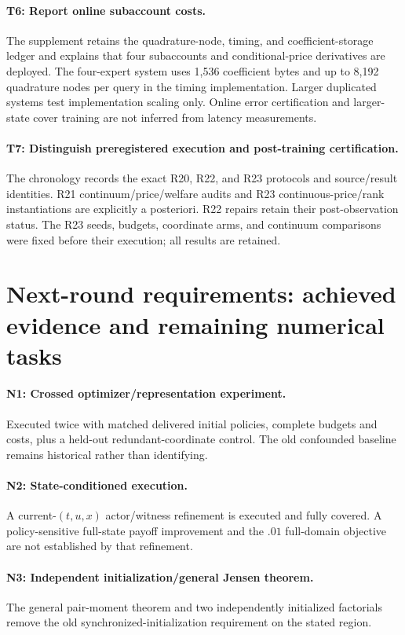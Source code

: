 \paragraph{T6: Report online subaccount costs.}
The supplement retains the quadrature-node, timing, and coefficient-storage ledger and explains that four subaccounts and conditional-price derivatives are deployed. The four-expert system uses 1,536 coefficient bytes and up to 8,192 quadrature nodes per query in the timing implementation. Larger duplicated systems test implementation scaling only. Online error certification and larger-state cover training are not inferred from latency measurements.

\paragraph{T7: Distinguish preregistered execution and post-training certification.}
The chronology records the exact R20, R22, and R23 protocols and source/result identities. R21 continuum/price/welfare audits and R23 continuous-price/rank instantiations are explicitly a posteriori. R22 repairs retain their post-observation status. The R23 seeds, budgets, coordinate arms, and continuum comparisons were fixed before their execution; all results are retained.

\section{Next-round requirements: achieved evidence and remaining numerical tasks}
\paragraph{N1: Crossed optimizer/representation experiment.}
Executed twice with matched delivered initial policies, complete budgets and costs, plus a held-out redundant-coordinate control. The old confounded baseline remains historical rather than identifying.
\paragraph{N2: State-conditioned execution.}
A current-$(t,u,x)$ actor/witness refinement is executed and fully covered. A policy-sensitive full-state payoff improvement and the $.01$ full-domain objective are not established by that refinement.
\paragraph{N3: Independent initialization/general Jensen theorem.}
The general pair-moment theorem and two independently initialized factorials remove the old synchronized-initialization requirement on the stated region.
